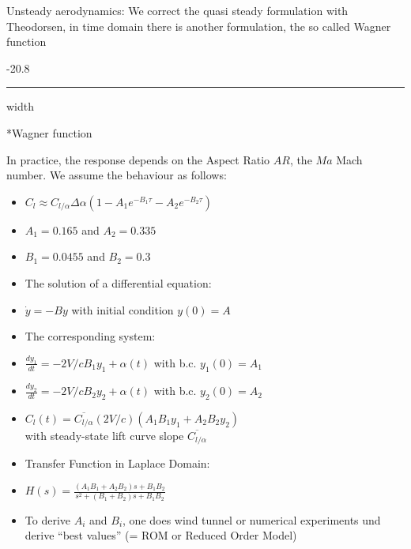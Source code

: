 \documentclass[8pt, landscape, fleqn]{scrartcl}
\makeatletter
\renewcommand{\subsubsection}{\@startsection{subsubsection}{1}{0mm}%
{-2\baselineskip}{0.8\baselineskip}%
{\hrule depth 0.2pt width\columnwidth\vspace*{1.2em}\normalsize\bfseries\rmfamily}}
\makeatother
\begin{document}
\begin{multicols*}{3}
 Unsteady aerodynamics: We correct the quasi steady formulation with Theodorsen, in time domain there is another formulation, the so called Wagner function

 \subsubsection*{Wagner function}

 In practice, the response depends on the Aspect Ratio $AR$, the $Ma$ Mach number. We assume the behaviour as follows:

 \begin{itemize}
     \item $C_l \approx C_{l/\alpha} \Delta \alpha (1- A_1 e^{-B_1 \tau} - A_2 e^{-B_2 \tau})$
     \item $A_1 = 0.165$ and $A_2 = 0.335$ 
     \item $B_1 = 0.0455$ and $B_2 = 0.3$
     \item The solution of a differential equation:
     \item $\dot{y} = -B y$ with initial condition $y(0) = A$
     \item The corresponding system:
     \item $\frac{dy_1}{dt} = -2V/c B_1 y_1+\alpha(t)$ with b.c. $y_1(0) = A_1$
     \item $\frac{dy_2}{dt} = -2V/c B_2 y_2+\alpha(t)$ with b.c. $y_2(0) = A_2$
     \item $C_l(t) = \overline{C_{l/\alpha}} (2V/c)(A_1B_1y_1 + A_2B_2y_2)$ \\ with steady-state lift curve slope $\overline{C_{l/\alpha}}$
     \item Transfer Function in Laplace Domain:
     \item $H(s) = \frac{(A_1B_1+A_2B_2)s + B_1B_2}{s^2+(B_1+B_2)s + B_1B_2}$
     \item To derive $A_i$ and $B_i$, one does wind tunnel or numerical experiments und derive ``best values'' (= ROM or Reduced Order Model)
 \end{itemize}


\end{multicols*}
\end{document}

